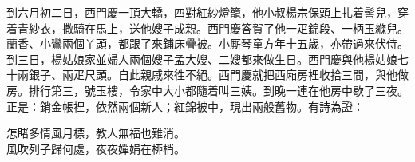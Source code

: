 到六月初二日，西門慶一頂大轎，四對紅紗燈籠，他小叔楊宗保頭上扎着髻兒，穿着青紗衣，撒騎在馬上，送他嫂子成親。西門慶答賀了他一疋錦段、一柄玉縧兒。蘭香、小鸞兩個丫頭，都跟了來鋪床疊被。小厮琴童方年十五歲，亦帶過來伏侍。到三日，楊姑娘家並婦人兩個嫂子孟大嫂、二嫂都來做生日。西門慶與他楊姑娘七十兩銀子、兩疋尺頭。自此親戚來徃不絕。西門慶就把西廂房裡收拾三間，與他做房。排行第三，號玉樓，令家中大小都隨着叫三姨。到晚一連在他房中歇了三夜。正是：銷金帳裡，依然兩個新人；紅錦被中，現出兩般舊物。有詩為證：

\begin{myquote} 
怎睹多情風月標，教人無福也難消。\\風吹列子歸何處，夜夜嬋娟在桺梢。
\end{myquote} 
